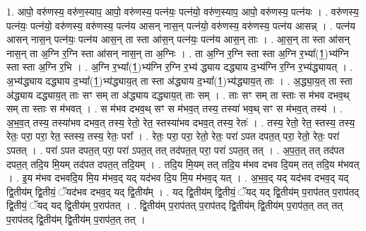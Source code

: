 \documentclass[17pt]{extarticle}
\begin{document}
1. आपो॒ वरु॑णस्य॒ वरु॑ण॒स्याप॒ आपो॒ वरु॑णस्य॒ पत्न॑यः॒ पत्न॑यो॒ वरु॑ण॒स्याप॒ आपो॒ वरु॑णस्य॒ पत्न॑यः । . वरु॑णस्य॒ पत्न॑यः॒ पत्न॑यो॒ वरु॑णस्य॒ वरु॑णस्य॒ पत्न॑य आसन् नास॒न् पत्न॑यो॒ वरु॑णस्य॒ वरु॑णस्य॒ पत्न॑य आसन्न् । . पत्न॑य आसन् नास॒न् पत्न॑यः॒ पत्न॑य आस॒न् ता स्ता आ॑स॒न् पत्न॑यः॒ पत्न॑य आस॒न् ताः । . आ॒स॒न् ता स्ता आ॑सन् नास॒न् ता अ॒ग्नि र॒ग्नि स्ता आ॑सन् नास॒न् ता अ॒ग्निः । . ता अ॒ग्नि र॒ग्नि स्ता स्ता अ॒ग्नि र॒भ्या᳚(1॒)भ्य॑ग्नि स्ता स्ता अ॒ग्नि र॒भि । . अ॒ग्नि र॒भ्या᳚(1॒)भ्य॑ग्नि र॒ग्नि र॒भ्य॑ द्ध्याय दद्ध्याय द॒भ्य॑ग्नि र॒ग्नि र॒भ्य॑द्ध्यायत् । . अ॒भ्य॑द्ध्याय दद्ध्याय द॒भ्या᳚(1॒)भ्य॑द्ध्याय॒त् ता स्ता अ॑द्ध्याय द॒भ्या᳚(1॒)भ्य॑द्ध्याय॒त् ताः । . अ॒द्ध्या॒य॒त् ता स्ता अ॑द्ध्याय दद्ध्याय॒त् ताः सꣳ सम् ता अ॑द्ध्याय दद्ध्याय॒त् ताः सम् । . ताः सꣳ सम् ता स्ताः स म॑भव दभव॒थ् सम् ता स्ताः स म॑भवत् । . स म॑भव दभव॒थ् सꣳ स म॑भव॒त् तस्य॒ तस्या॑ भव॒थ् सꣳ स म॑भव॒त् तस्य॑ । . अ॒भ॒व॒त् तस्य॒ तस्या॑भव दभव॒त् तस्य॒ रेतो॒ रेत॒ स्तस्या॑भव दभव॒त् तस्य॒ रेतः॑ । . तस्य॒ रेतो॒ रेत॒ स्तस्य॒ तस्य॒ रेतः॒ परा॒ परा॒ रेत॒ स्तस्य॒ तस्य॒ रेतः॒ परा᳚ । . रेतः॒ परा॒ परा॒ रेतो॒ रेतः॒ परा॑ ऽपत दपत॒त् परा॒ रेतो॒ रेतः॒ परा॑ ऽपतत् । . परा॑ ऽपत दपत॒त् परा॒ परा॑ ऽपत॒त् तत् तद॑पत॒त् परा॒ परा॑ ऽपत॒त् तत् । . अ॒प॒त॒त् तत् तद॑पत दपत॒त् तदि॒य मि॒यम् तद॑पत दपत॒त् तदि॒यम् । . तदि॒य मि॒यम् तत् तदि॒य म॑भव दभव दि॒यम् तत् तदि॒य म॑भवत् । . इ॒य म॑भव दभवदि॒य मि॒य म॑भव॒द् यद् यद॑भव दि॒य मि॒य म॑भव॒द् यत् । . अ॒भ॒व॒द् यद् यद॑भव दभव॒द् यद् द्वि॒तीय॑म् द्वि॒तीयं॒ ॅयद॑भव दभव॒द् यद् द्वि॒तीय᳚म् । . यद् द्वि॒तीय॑म् द्वि॒तीयं॒ ॅयद् यद् द्वि॒तीय॑म् प॒राप॑तत् प॒राप॑तद् द्वि॒तीयं॒ ॅयद् यद् द्वि॒तीय॑म् प॒राप॑तत् । . द्वि॒तीय॑म् प॒राप॑तत् प॒राप॑तद् द्वि॒तीय॑म् द्वि॒तीय॑म् प॒राप॑त॒त् तत् तत् प॒राप॑तद् द्वि॒तीय॑म् द्वि॒तीय॑म् प॒राप॑त॒त् तत् । \newline
\end{document}
